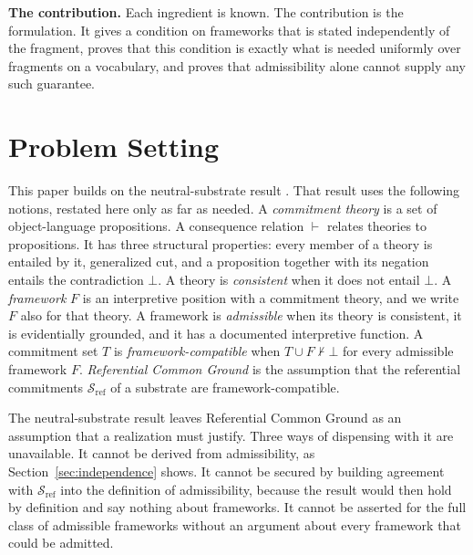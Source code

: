 \documentclass[11pt]{article}
\theoremstyle{plain}
\theoremstyle{definition}
\theoremstyle{remark}
\newcommand{\SecRef}[1]{Section~\ref{#1}}
\newcommand{\SubstrateRef}{\mathcal{S}_{\mathrm{ref}}}
\newcommand{\Framework}{F}
\newcommand{\entails}{\vdash}
\newcommand{\notentails}{\nvdash}
\begin{document}
\textbf{The contribution.}
Each ingredient is known.
The contribution is the formulation.
It gives a condition on frameworks that is stated independently of the
fragment, proves that this condition is exactly what is needed uniformly over
fragments on a vocabulary, and proves that admissibility alone cannot supply
any such guarantee.


\section{Problem Setting}
\label{sec:problem-setting}

This paper builds on the neutral-substrate result \citep{case2026neutral}.
That result uses the following notions, restated here only as far as needed.
A \emph{commitment theory} is a set of object-language propositions.
A consequence relation $\entails$ relates theories to propositions.
It has three structural properties: every member of a theory is entailed by it,
generalized cut, and a proposition together with its negation entails the
contradiction $\bot$.
A theory is \emph{consistent} when it does not entail $\bot$.
A \emph{framework} $\Framework$ is an interpretive position with a commitment
theory, and we write $\Framework$ also for that theory.
A framework is \emph{admissible} when its theory is consistent, it is
evidentially grounded, and it has a documented interpretive function.
A commitment set $T$ is \emph{framework-compatible} when
$T \cup \Framework \notentails \bot$ for every admissible framework
$\Framework$.
\emph{Referential Common Ground} is the assumption that the referential
commitments $\SubstrateRef$ of a substrate are framework-compatible.

The neutral-substrate result leaves Referential Common Ground as an assumption
that a realization must justify.
Three ways of dispensing with it are unavailable.
It cannot be derived from admissibility, as \SecRef{sec:independence} shows.
It cannot be secured by building agreement with $\SubstrateRef$ into the
definition of admissibility, because the result would then hold by definition
and say nothing about frameworks.
It cannot be asserted for the full class of admissible frameworks without an
argument about every framework that could be admitted.
\end{document}
